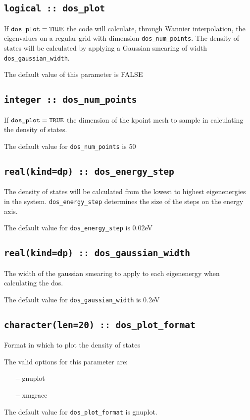 \subsection[dos\_plot]{\tt logical :: dos\_plot}

If $\verb#dos_plot#=\verb#TRUE#$ the code will calculate,
through Wannier interpolation, the
eigenvalues on a regular grid with dimension \verb#dos_num_points#. The
density of states will be calculated by applying a Gaussian smearing of
width \verb#dos_gaussian_width#.

The default value of this parameter is FALSE


\subsection[dos\_num\_points]{\tt integer :: dos\_num\_points}

If $\verb#dos_plot#=\verb#TRUE#$ the dimension of the kpoint mesh
to sample in calculating the density of states.

The default value for \verb#dos_num_points# is 50

\subsection[dos\_energy\_step]{\tt real(kind=dp) :: dos\_energy\_step}

The density of states will be calculated from the
lowest to highest eigenenergies in the system. \verb#dos_energy_step# determines
the size of the steps on the energy axis.

The default value for \verb#dos_energy_step# is 0.02eV

\subsection[dos\_gaussian\_width]{\tt real(kind=dp) :: dos\_gaussian\_width}

The width of the gaussian smearing to apply to each eigenenergy when
calculating the dos.


The default value for \verb#dos_gaussian_width# is 0.2eV

\subsection[dos\_plot\_format]{\tt character(len=20) :: dos\_plot\_format}

Format in which to plot the density of states

The valid options for this parameter are:
\begin{itemize}
\item[{\bf --}] gnuplot
\item[{\bf --}] xmgrace
\end{itemize}

The default value for \verb#dos_plot_format# is gnuplot.


